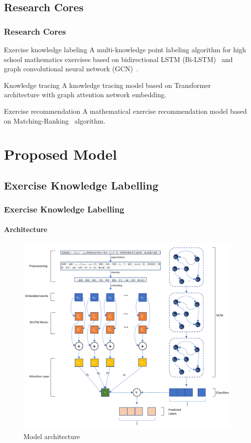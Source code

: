 \documentclass{beamer}
\begin{document}
\subsection{Research Cores}
\begin{frame}
  \frametitle{Research Cores}
  \begin{block}{Exercise knowledge labeling}
    A multi-knowledge point labeling algorithm for high school mathematics exercises based on bidirectional LSTM (Bi-LSTM)~\cite{chen2017improving} and graph convolutional neural network (GCN)~\cite{kipf2016semi}.
  \end{block}
  \begin{block}{Knowledge tracing}
    A knowledge tracing model based on Transformer~\cite{vaswani2017attention} architecture with graph attention network embedding.
  \end{block}
  \begin{block}{Exercise recommendation}
    A mathematical exercise recommendation model based on Matching-Ranking~\cite{segev2009context} algorithm.
  \end{block}
\end{frame}
\section{Proposed Model}
\subsection{Exercise Knowledge Labelling}
\begin{frame}
  \frametitle{Exercise Knowledge Labelling}
  \framesubtitle{Architecture}
  \begin{figure}
    \includegraphics[height=0.8\textheight]{figures/ch2-model-architecture.pdf}
    \caption{Model architecture}\label{fig:ch2-archi}
  \end{figure}
\end{frame}
\end{document}
